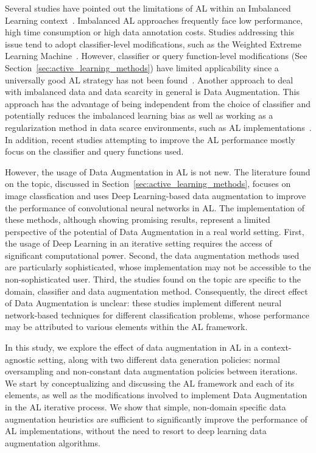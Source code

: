 \documentclass[parskip=full]{scrartcl}
\begin{document}
Several studies have pointed out the limitations of AL within an Imbalanced
Learning context~\cite{Yu2019}. Imbalanced AL approaches frequently face low
performance, high time consumption or high data annotation costs.  Studies
addressing this issue tend to adopt classifier-level modifications, such as
the Weighted Extreme Learning Machine~\cite{Zong2013, Yu2019}. However,
classifier or query function-level modifications (See
Section~\ref{sec:active_learning_methods}) have limited applicability since a
universally good AL strategy has not been found~\cite{Sener2018}. Another
approach to deal with imbalanced data and data scarcity in general is Data
Augmentation. This approach has the advantage of being independent from the
choice of classifier and potentially reduces the imbalanced learning bias as
well as working as a regularization method in data scarce environments, such
as AL implementations~\cite{Kim2021}. In addition, recent studies attempting
to improve the AL performance mostly focus on the classifier and query
functions used.


However, the usage of Data Augmentation in AL is not new. The literature found
on the topic, discussed in Section~\ref{sec:active_learning_methods}, focuses
on image classfication and uses Deep Learning-based data augmentation to
improve the performance of convolutional neural networks in AL\@. The
implementation of these methods, although showing promising results, represent
a limited perspective of the potential of Data Augmentation in a real world
setting. First, the usage of Deep Learning in an iterative setting requires
the access of significant computational power. Second, the data augmentation
methods used are particularly sophisticated, whose implementation may not be
accessible to the non-sophisticated user. Third, the studies found on the
topic are specific to the domain, classifier and data augmentation method.
Consequently, the direct effect of Data Augmentation is unclear: these studies
implement different neural network-based techniques for different
classification problems, whose performance may be attributed to various
elements within the AL framework.

In this study, we explore the effect of data augmentation in AL in a
context-agnostic setting, along with two different data generation policies:
normal oversampling and non-constant data augmentation policies between
iterations. We start by conceptualizing and discussing the AL framework and
each of its elements, as well as the modifications involved to implement Data
Augmentation in the AL iterative process. We show that simple, non-domain
specific data augmentation heuristics are sufficient to significantly improve
the performance of AL implementations, without the need to resort to deep
learning data augmentation algorithms.
\end{document}
